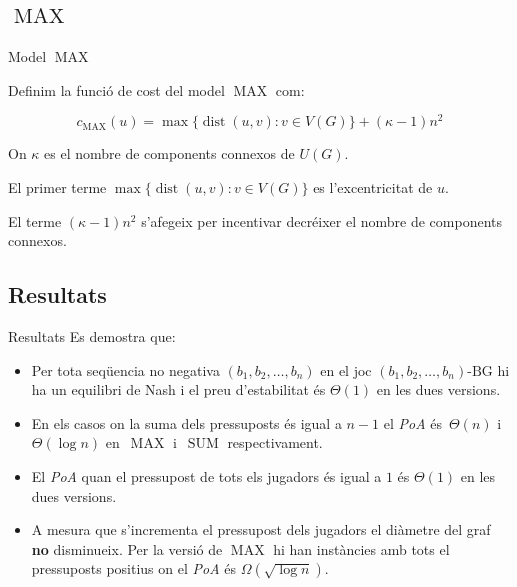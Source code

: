 \documentclass[aspectratio=169]{beamer}
\DeclareMathOperator{\dist}{dist}
\DeclareMathOperator{\SUM}{SUM}
\DeclareMathOperator{\MAX}{MAX}
\begin{document}
\subsection{\texorpdfstring{$\MAX$}{MAX}}
\begin{frame}{Model $\MAX$}

Definim la funció de cost del model $\MAX$ com:

\begin{equation}
    c_{\MAX}(u) = \max \{ \dist(u, v) : v \in V(G) \} + (\kappa - 1)n^2
\end{equation}

On $\kappa$ es el nombre de components connexos de $U(G)$.

\vspace{2em}

El primer terme $\max \{ \dist(u, v) : v \in V(G) \}$ es l'excentricitat de $u$.

El terme $(\kappa - 1)n^2$ s'afegeix per incentivar decréixer el nombre de components connexos.

\end{frame}

\subsection{Resultats}
\begin{frame}{Resultats}
Es demostra que:

\begin{itemize}[<+->] 

    
    \item Per tota seqüencia no negativa $ (b_1, b_2, \dots , b_n)$ en el joc $ (b_1, b_2, \dots , b_n)\text{-BG} $ hi ha un equilibri de Nash i el preu d'estabilitat és $\Theta(1)$ en les dues versions.
    
    \vspace{1em}
    
    \item En els casos on la suma dels pressuposts és igual a $n-1$ el \emph{PoA}
    és~$\Theta(n)$ i~$\Theta(\log n)$ en~$\MAX$ i~$\SUM$ respectivament.
    
    \vspace{1em}
    
    \item El \emph{PoA} quan el pressupost de tots els jugadors és igual a $1$ és $\Theta(1)$ en les dues versions.
    
    \vspace{1em}
    
    \item A mesura que s'incrementa el pressupost dels jugadors el diàmetre del graf \textbf{no} disminueix. Per la versió de $\MAX$ hi han instàncies amb tots el pressuposts positius on el \emph{PoA} és $\Omega(\sqrt{\log n})$.
    
\end{itemize}
\end{frame}
\end{document}
